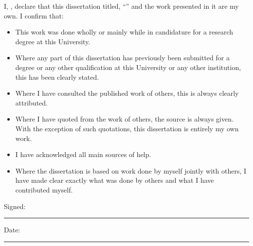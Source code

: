 \documentclass[
11pt, %
english, %
doublespacing, %
headsepline, %
]{MastersDoctoralThesis} %
\begin{document}

\begin{declaration}
\addchaptertocentry{\authorshipname} %
\noindent I, \authorname, declare that this dissertation titled, \enquote{\ttitle} and the work presented in it are my own. I confirm that:

\begin{itemize} 
\item This work was done wholly or mainly while in candidature for a research degree at this University.
\item Where any part of this dissertation has previously been submitted for a degree or any other qualification at this University or any other institution, this has been clearly stated.
\item Where I have consulted the published work of others, this is always clearly attributed.
\item Where I have quoted from the work of others, the source is always given. With the exception of such quotations, this dissertation is entirely my own work.
\item I have acknowledged all main sources of help.
\item Where the dissertation is based on work done by myself jointly with others, I have made clear exactly what was done by others and what I have contributed myself.\\
\end{itemize}
 
\noindent Signed:\\
\rule[0.5em]{25em}{0.5pt} %
 
\noindent Date:\\
\rule[0.5em]{25em}{0.5pt} %
\end{declaration}

\cleardoublepage



\end{document}
